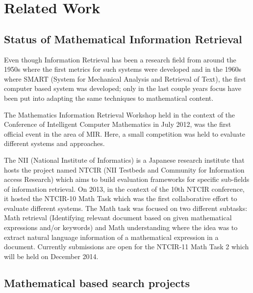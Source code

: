 \chapter{Related Work}
\label{chap-related_work}
\section{Status of Mathematical Information Retrieval}
Even though Information Retrieval has been a research field from around the 1950s where the first metrics for such systems were developed and in the 1960s where SMART (System for Mechanical Analysis and Retrieval of Text), the first computer based system was developed; only in the last couple years focus have been put into adapting the same techniques to mathematical content. 

The Mathematics Information Retrieval Workshop\cite{mir_worksop} held in the context of the Conference of Intelligent Computer Mathematics in July 2012, was the first official event in the area of MIR. Here, a small competition was held to evaluate different systems and approaches.

The NII\cite{nii} (National Institute of Informatics) is a Japanese research institute that hosts the project named NTCIR (NII Testbeds and Community for Information access Research) which aims to build evaluation frameworks for specific sub-fields of information retrieval. On 2013, in the context of the 10th NTCIR conference, it hosted the NTCIR-10 Math Task \cite{math_task} which was the first collaborative effort to evaluate different systems. The Math task was focused on two different subtasks: Math retrieval (Identifying relevant document based on given mathematical expressions and/or keywords) and Math understanding where the idea was to extract natural language information of a mathematical expression in a document. Currently submissions are open for the NTCIR-11 Math Task 2 which will be held on December 2014.

\section{Mathematical based search projects}

